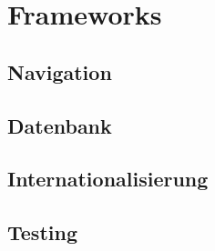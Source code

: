 \section{Frameworks}

\subsection{Navigation}

\subsection{Datenbank}

\subsection{Internationalisierung}

\subsection{Testing}